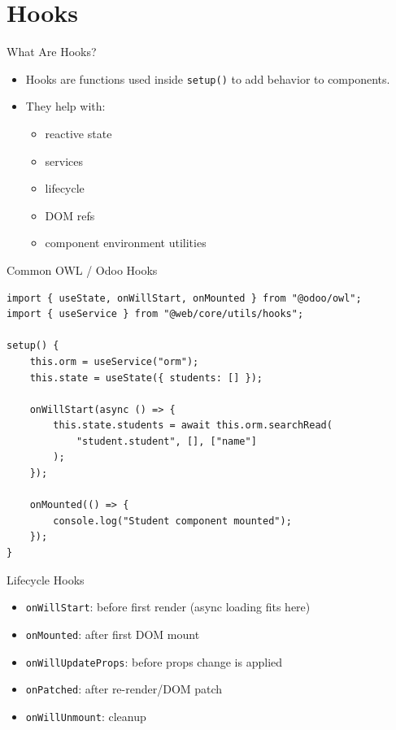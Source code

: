 \section{Hooks}

\begin{frame}{What Are Hooks?}
	\begin{itemize}
		\item Hooks are functions used inside \texttt{setup()} to add behavior to components.
		\item They help with:
		\begin{itemize}
			\item reactive state
			\item services
			\item lifecycle
			\item DOM refs
			\item component environment utilities
		\end{itemize}
	\end{itemize}
\end{frame}

\begin{frame}[fragile]{Common OWL / Odoo Hooks}
\begin{lstlisting}[style=js]
import { useState, onWillStart, onMounted } from "@odoo/owl";
import { useService } from "@web/core/utils/hooks";

setup() {
	this.orm = useService("orm");
	this.state = useState({ students: [] });

	onWillStart(async () => {
		this.state.students = await this.orm.searchRead(
			"student.student", [], ["name"]
		);
	});

	onMounted(() => {
		console.log("Student component mounted");
	});
}
\end{lstlisting}
\end{frame}

\begin{frame}[fragile]{Lifecycle Hooks}
	\begin{itemize}
		\item \texttt{onWillStart}: before first render (async loading fits here)
		\item \texttt{onMounted}: after first DOM mount
		\item \texttt{onWillUpdateProps}: before props change is applied
		\item \texttt{onPatched}: after re-render/DOM patch
		\item \texttt{onWillUnmount}: cleanup
	\end{itemize}
\end{frame}

